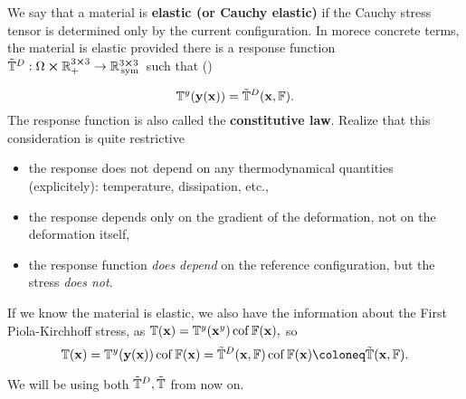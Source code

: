 \documentclass[11pt]{scrartcl} %
\begin{document}
\begin{definition}[Elasticity]
	We say that a material is \textbf{elastic (or Cauchy elastic)} if the Cauchy stress tensor is determined only by the current configuration. In morece concrete terms, the material is elastic provided there is a response function $\tilde{\mathbb{T}}^D:\Omega \cross {\mathbb R}^{3 \cross 3}_+ \to {\mathbb R}^{3 \cross 3}_{\, \text{sym} \,}$ such that (\cite{kruzikElasticMaterials2019})

\[
	\mathbb{T}^y\qty(\vb{y}(\vb{x}))= \tilde{\mathbb{T}}^D\qty(\vb{x},\mathbb{F}).
\]
The response function is also called the \textbf{constitutive law}. Realize that this consideration is quite restrictive 

\begin{itemize}
	\item the response does not depend on any thermodynamical quantities (explicitely): temperature, dissipation, etc.,
	\item the response depends only on the gradient of the deformation, not on the deformation itself,
	\item the response function \textit{does depend} on the reference configuration, but the stress \textit{does not}.
\end{itemize}
\end{definition}

\begin{remark}
	If we know the material is elastic, we also have the information about the First Piola-Kirchhoff stress, as $\mathbb{T}\qty(\vb{x}) = \mathbb{T}^y\qty(\vb{x}^{y})\operatorname{cof} \mathbb{F}\qty(\vb{x}),$ so
	\begin{equation}
		\label{eq:response_undeformed}
		\pkstress\qty(\vb{x}) =\cstress\qty(\vb{y}\qty(\vb{x}))\cof \fgrad\qty(\vb{x}) =  \tilde{\tensorq{T}}^D\qty(\vb{x}, \fgrad) \cof \fgrad\qty(\vb{x}) \coloneq \tilde{\tensorq{T}}\qty(\vb{x},\fgrad).
	\end{equation}
\end{remark}
We will be using both $\tilde{\mathbb{T}}^D, \tilde{\mathbb{T}}$ from now on.
\end{document}
